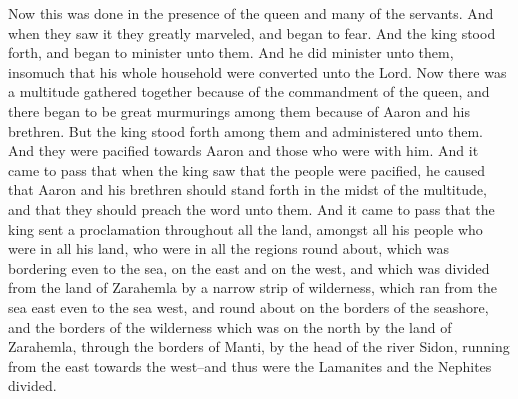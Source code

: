 \bverse \iffalse Now this was done in the presence of the queen and many of the servants. And when they saw it they greatly marveled, and began to fear. And the king stood forth, and began to minister unto them. And he did minister unto them, insomuch that his whole household were converted unto the Lord. \fi
Now this was done in the presence of the queen and many of the servants. And when they saw it they greatly marveled, and began to fear. And the king stood forth, and began to minister unto them. And he did minister unto them, insomuch that his whole household were converted unto the Lord.
\bverse \iffalse Now there was a multitude gathered together because of the commandment of the queen, and there began to be great murmurings among them because of Aaron and his brethren. \fi
Now there was a multitude gathered together because of the commandment of the queen, and there began to be great murmurings among them because of Aaron and his brethren.
\bverse \iffalse But the king stood forth among them and administered unto them. And they were pacified towards Aaron and those who were with him. \fi
But the king stood forth among them and administered unto them. And they were pacified towards Aaron and those who were with him.
\bverse \iffalse And it came to pass that when the king saw that the people were pacified, he caused that Aaron and his brethren should stand forth in the midst of the multitude, and that they should preach the word unto them. \fi
And it came to pass that when the king saw that the people were pacified, he caused that Aaron and his brethren should stand forth in the midst of the multitude, and that they should preach the word unto them.
\bverse \iffalse And it came to pass that the king sent a proclamation throughout all the land, amongst all his people who were in all his land, who were in all the regions round about, which was bordering even to the sea, on the east and on the west, and which was divided from the land of Zarahemla by a narrow strip of wilderness, which ran from the sea east even to the sea west, and round about on the borders of the seashore, and the borders of the wilderness which was on the north by the land of Zarahemla, through the borders of Manti, by the head of the river Sidon, running from the east towards the west--and thus were the Lamanites and the Nephites divided. \fi
And it came to pass that the king sent a proclamation throughout all the land, amongst all his people who were in all his land, who were in all the regions round about, which was bordering even to the sea, on the east and on the west, and which was divided from the land of Zarahemla by a narrow strip of wilderness, which ran from the sea east even to the sea west, and round about on the borders of the seashore, and the borders of the wilderness which was on the north by the land of Zarahemla, through the borders of Manti, by the head of the river Sidon, running from the east towards the west--and thus were the Lamanites and the Nephites divided.
